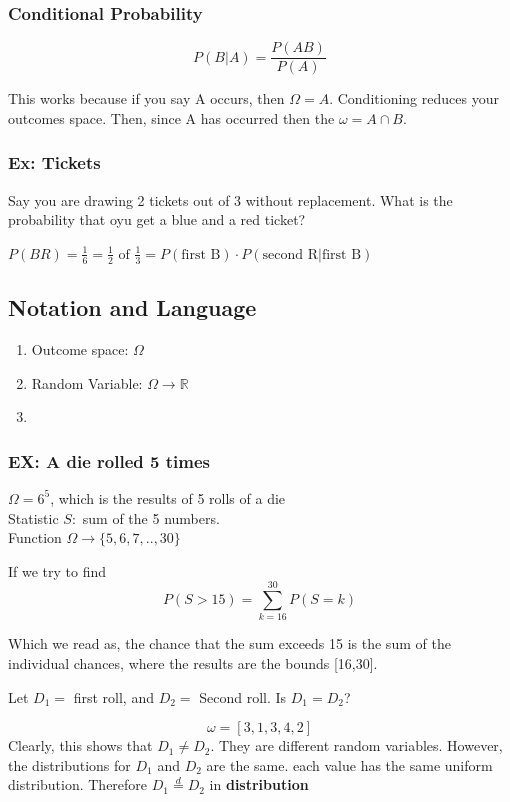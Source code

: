 \documentclass{report}
\begin{document}
\subsubsection{Conditional Probability}
\[P(B|A) = \frac{P(AB)}{P(A)}  \]

This works because if you say A occurs, then $\Omega = A$. Conditioning reduces your outcomes space. Then, since A has occurred then the $\omega = A \cap B$. 

\subsubsection{Ex: Tickets} Say you are drawing 2 tickets out of 3 without replacement. What is the probability that oyu get a blue and a red ticket? 

$P(BR) = \frac{1}6  = \frac{1}2 \text{ of } \frac{1}3 = P(\text{first B}) \cdot P(\text{second R} | \text{first B})$ 

\subsection{Notation and Language}
\begin{enumerate}
    \item Outcome space: $\Omega$ 
    \item Random Variable: $\Omega \rightarrow \mathbb{R}$
    \item 
\end{enumerate}

\subsubsection{EX: A die rolled 5 times}
$\Omega = 6^5$, which is the results of 5 rolls of a die
\\Statistic $S:$ sum of the 5 numbers. 
\\Function $\Omega \rightarrow \{5,6,7,..,30\}$

If we try to find 
\[P(S > 15) = \sum_{k=16}^{30}P(S = k)\]

Which we read as, the chance that the sum exceeds 15 is the sum of the individual chances, where the results are the bounds [16,30].

Let $D_1 =$ first roll, and $D_2 =$ Second roll. Is $D_1 = D_2$?

\[\omega = [3,1,3,4,2] \] 
Clearly, this shows that $D_1 \neq D_2$. They are different random variables. However, the distributions for $D_1$ and $D_2$ are the same. each value has the same uniform distribution. Therefore $D_1 \stackrel{d}{=} D_2 $ in \textbf{distribution}
\end{document}
